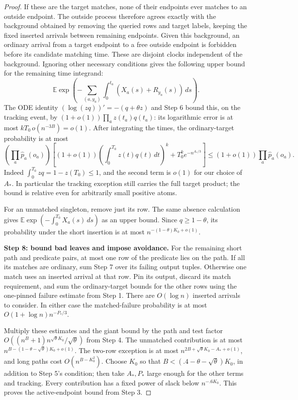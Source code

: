 \begin{proof}
If these are the target matches, none of their endpoints ever matches
to an outside endpoint. The outside process therefore agrees exactly
with the background obtained by removing the queried rows and target
labels, keeping the fixed inserted arrivals between remaining endpoints.
Given this background, an ordinary arrival from a target endpoint to a
free outside endpoint is forbidden before its candidate matching time.
These are disjoint clocks independent of the background. Ignoring other
necessary conditions gives the following upper bound for the remaining
time integrand:
\[
 \mathbb E\exp\left(-\sum_{(a,y_a)}
           \int_0^{t_a}(X_a(s)+R_{y_a}(s))\,ds\right).
\]
The ODE identity
\((\log(zq))'=-(q+\theta z)\) and Step 6 bound this, on the tracking
event, by \((1+o(1))\prod_a z(t_a)q(t_a)\): its logarithmic error is
at most \(kT_0\,o(n^{-3B})=o(1)\). After integrating the times, the
ordinary-target probability is at most
\[
 \left(\prod_a\widehat p_a(o_a)\right)
 \left[(1+o(1))\left(\int_0^{T_0}z(t)q(t)\,dt\right)^k
                 +T_0^k e^{-n^{A_*/3}}\right]
 \le(1+o(1))\prod_a\widehat p_a(o_a).
\]
Indeed \(\int_0^{T_0}zq=1-z(T_0)\le1\), and the second term is
\(o(1)\) for our choice of \(A_*\). In particular the tracking exception
still carries the full target product; the bound is relative even for
arbitrarily small positive atoms.

For an unmatched singleton, remove just its row. The same absence
calculation gives \(\mathbb E\exp(-\int_0^{T_0}X_a(s)\,ds)\) as an
upper bound. Since \(q\ge1-\theta\), its probability under the short
insertion is at most \(n^{-(1-\theta)K_0+o(1)}\).

\noindent\textbf{Step 8: bound bad leaves and impose avoidance.}\quad
For the remaining short path and predicate pairs, at most one row of the
predicate lies on the path. If all its matches are ordinary, sum Step 7
over its failing output tuples. Otherwise one match uses an inserted
arrival at that row. Pin its output, discard its match requirement, and
sum the ordinary-target bounds for the other rows using the one-pinned
failure estimate from Step 1. There are \(O(\log n)\) inserted arrivals
to consider. In either case the matched-failure probability is at most
\(O(1+\log n)n^{-P_*/3}\).

Multiply these estimates and the giant bound by the path and test factor
\(O((n^B+1)n^{\sqrt\theta K_0}/\sqrt\theta)\) from Step 4. The
unmatched contribution is at most
\(n^{B-(1-\theta-\sqrt\theta)K_0+o(1)}\). The two-row exception is
at most \(n^{2B+\sqrt\theta K_0-A_*+o(1)}\), and long paths cost
\(O(n^{B-K_0^2})\). Choose \(K_0\) so that
\(B<(.4-\theta-\sqrt\theta)K_0\), in addition to Step 5's condition;
then take \(A_*,P_*\) large enough for the other terms and tracking.
Every contribution has a fixed power of slack below \(n^{-.6K_0}\).
This proves the active-endpoint bound from Step 3.


\end{proof}
